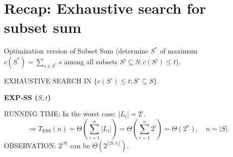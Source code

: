 \section{Recap: Exhaustive search for subset sum}
Optimization version of Subset Sum (determine $S^*$ of maximum $c(S^*)=\sum_{s\in S^*}s$ among all subsets $S'\subseteq S:c(S')\leq t$).

EXHAUSTIVE SEARCH IN $\{c(S')\leq t:S'\subseteq S\}$.
\begin{notesalgorithm}
\textbf{EXP-SS ($S,t$)}
\begin{notespseudocode}
\end{notespseudocode}
\end{notesalgorithm}
RUNNING TIME: In the worst case: $|L_i|=2^i$.
\[\Rightarrow T_{\mathrm{ESS}}(n)=\Theta\left(\sum_{i=1}^n|L_i|\right)
=\Theta\left(\sum_{i=1}^n2^i\right)=\Theta(2^n),\quad n=|S|.\]
OBSERVATION: $2^{|S|}$ can be $\Theta(2^{|\langle S,t\rangle|})$.
